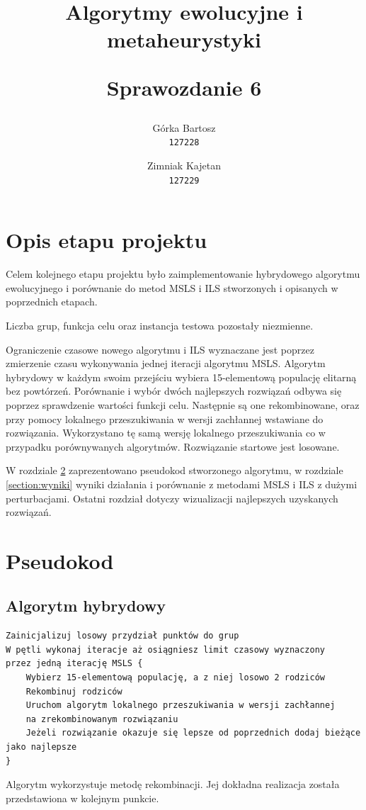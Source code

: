 \documentclass[main.tex]{subfiles}
\begin{document}
\title{
    \textbf{Algorytmy ewolucyjne i metaheurystyki}\\
    \begin{large}
        Sprawozdanie 6
    \end{large}
}

\author{
    Górka Bartosz\\
  \texttt{127228}
  \and
  Zimniak Kajetan\\
  \texttt{127229}
}

\date{}

\maketitle

\section{Opis etapu projektu}
Celem kolejnego etapu projektu było zaimplementowanie hybrydowego algorytmu ewolucyjnego i porównanie do metod MSLS i ILS stworzonych i opisanych w poprzednich etapach.

Liczba grup, funkcja celu oraz instancja testowa pozostały niezmienne.

Ograniczenie czasowe nowego algorytmu i ILS wyznaczane jest poprzez zmierzenie czasu wykonywania jednej iteracji algorytmu MSLS. Algorytm hybrydowy w każdym swoim przejściu wybiera 15-elementową populację elitarną bez powtórzeń. Porównanie i wybór dwóch najlepszych rozwiązań odbywa się poprzez sprawdzenie wartości funkcji celu. Następnie są one rekombinowane, oraz przy pomocy lokalnego przeszukiwania w wersji zachłannej wstawiane do rozwiązania. Wykorzystano tę samą wersję lokalnego przeszukiwania co w przypadku porównywanych algorytmów. Rozwiązanie startowe jest losowane.

W rozdziale \ref{section:pseudokody} zaprezentowano pseudokod stworzonego algorytmu, w rozdziale \ref{section:wyniki} wyniki działania i porównanie z metodami MSLS i ILS z dużymi perturbacjami. Ostatni rozdział dotyczy wizualizacji najlepszych uzyskanych rozwiązań.

\section{Pseudokod}
\label{section:pseudokody}
\subsection{Algorytm hybrydowy}
\begin{verbatim}
Zainicjalizuj losowy przydział punktów do grup
W pętli wykonaj iteracje aż osiągniesz limit czasowy wyznaczony 
przez jedną iterację MSLS {
    Wybierz 15-elementową populację, a z niej losowo 2 rodziców
    Rekombinuj rodziców
    Uruchom algorytm lokalnego przeszukiwania w wersji zachłannej 
    na zrekombinowanym rozwiązaniu
    Jeżeli rozwiązanie okazuje się lepsze od poprzednich dodaj bieżące jako najlepsze
}
\end{verbatim}
Algorytm wykorzystuje metodę rekombinacji. Jej dokładna realizacja została przedstawiona w kolejnym punkcie.
\end{document}
